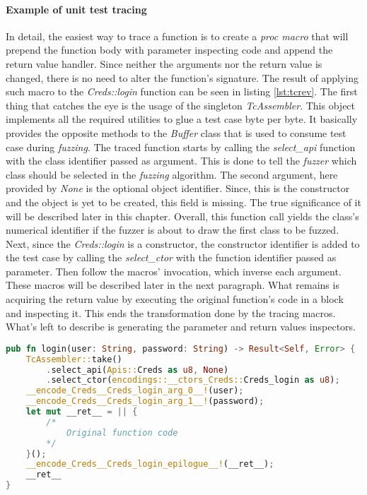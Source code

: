 \paragraph{Example of unit test tracing}
In detail, the easiest way to trace a function is to create a \textit{proc macro} that will prepend the function body with parameter inspecting code and append the return value handler. Since neither the arguments nor the return value is changed, there is no need to alter the function's signature. The result of applying such macro to the \textit{Creds::login} function can be seen in listing \ref{lst:tcrev}. The first thing that catches the eye is the usage of the singleton \textit{TcAssembler}. This object implements all the required utilities to glue a test case byte per byte. It basically provides the opposite methods to the \textit{Buffer} class that is used to consume test case during \textit{fuzzing}. The traced function starts by calling the \textit{select\_api} function with the class identifier passed as argument. This is done to tell the \textit{fuzzer} which class should be selected in the \textit{fuzzing} algorithm. The second argument, here provided by \textit{None} is the optional object identifier. Since, this is the constructor and the object is yet to be created, this field is missing. The true significance of it will be described later in this chapter. Overall, this function call yields the class's numerical identifier if the fuzzer is about to draw the first class to be fuzzed. Next, since the \textit{Creds::login} is a constructor, the constructor identifier is added to the test case by calling the \textit{select\_ctor} with the function identifier passed as parameter. Then follow the macros' invocation, which inverse each argument. These macros will be described later in the next paragraph. What remains is acquiring the return value by executing the original function's code in a block and inspecting it. This ends the transformation done by the tracing macros. What's left to describe is generating the parameter and return values inspectors.

\begin{minipage}{\linewidth}
\begin{lstlisting}[language=rust,caption={Exmaple testcase reversing code.},label={lst:tcrev}]
pub fn login(user: String, password: String) -> Result<Self, Error> {
    TcAssembler::take()
        .select_api(Apis::Creds as u8, None)
        .select_ctor(encodings::__ctors_Creds::Creds_login as u8);
    __encode_Creds__Creds_login_arg_0__!(user);
    __encode_Creds__Creds_login_arg_1__!(password);
    let mut __ret__ = || {
        /*
            Original function code
        */
    }();
    __encode_Creds__Creds_login_epilogue__!(__ret__);
    __ret__
}
\end{lstlisting}
\end{minipage}


